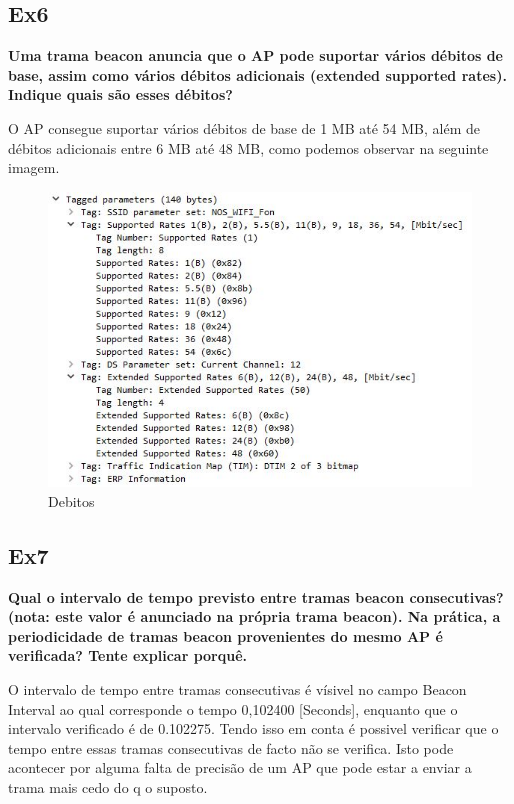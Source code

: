 \documentclass{article}
\begin{document}
\subsection{Ex6}
\textbf{Uma trama beacon anuncia que o AP pode suportar vários débitos de base, assim como vários débitos adicionais (extended supported rates). Indique quais são esses débitos?}\\\par
O AP consegue suportar vários débitos de base de 1 MB até 54 MB, além de débitos adicionais entre 6 MB até 48 MB, como podemos observar na seguinte imagem.
\begin{figure}[h]
	\centering
	\includegraphics[scale = 0.6]{ex-6.JPG}
	\caption{Debitos}
\end{figure}

\subsection{Ex7}
\textbf{Qual o intervalo de tempo previsto entre tramas beacon consecutivas? (nota: este valor é anunciado na própria trama beacon). Na prática, a periodicidade de tramas beacon provenientes do mesmo AP é verificada? Tente explicar porquê.}\\\par
O intervalo de tempo entre tramas consecutivas é vísivel no campo Beacon Interval ao qual corresponde o tempo 0,102400 [Seconds], enquanto que o intervalo verificado é de 0.102275.
Tendo isso em conta é possivel verificar que o tempo entre essas tramas consecutivas de facto não se verifica. Isto pode acontecer por alguma falta de precisão de um AP que pode estar a enviar a trama mais cedo do q o suposto.
\end{document}
